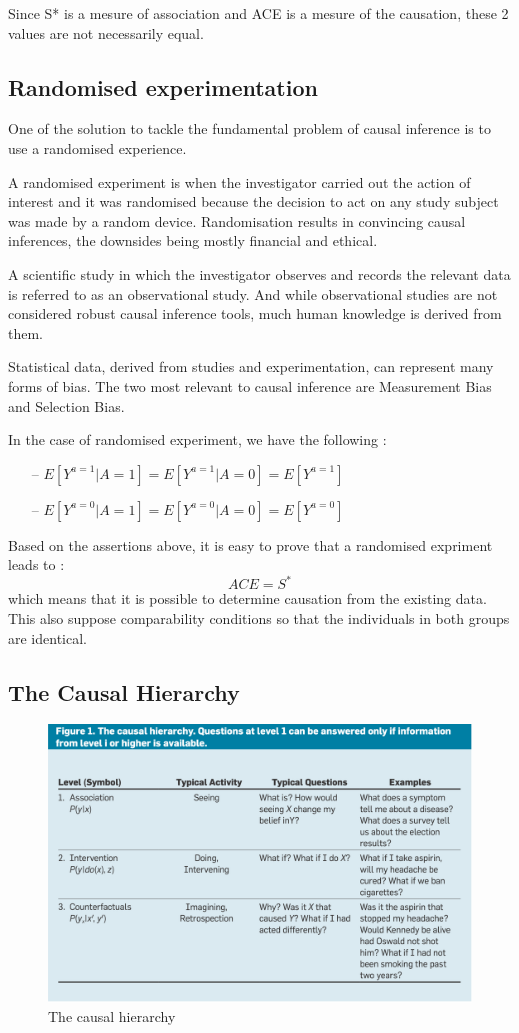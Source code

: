 \documentclass{article}
\begin{document}
Since S* is a mesure of association and ACE is a mesure of the causation, these 2 values are not necessarily equal.


\subsection{Randomised experimentation}

One of the solution to tackle the fundamental problem of causal inference is to use a randomised experience. 

A randomised experiment is when the investigator carried out the action of interest and it was randomised because the decision to act on any study subject was made by a random device. Randomisation results in convincing causal inferences, the downsides being mostly financial and ethical. 

A scientific study in which the investigator observes and records the relevant data is referred to as an observational study. And while observational studies are not considered robust causal inference tools, much human knowledge is derived from them.

Statistical data, derived from studies and experimentation, can represent many forms of bias. The two most relevant to causal inference are Measurement Bias and Selection Bias.


In the case of randomised experiment, we have the following : 

\begin{itemize}
\item[--] $ E[Y^{a=1}|A=1] =  E[Y^{a=1}|A=0] =  E[Y^{a=1}] $
\item[--] $ E[Y^{a=0}|A=1] =  E[Y^{a=0}|A=0] =  E[Y^{a=0}] $
\end{itemize}

Based on the assertions above, it is easy to prove that a randomised expriment leads to  : $$ ACE = S^{*} $$ which means that it is possible to determine causation from the existing data. This also suppose comparability conditions so that the individuals in both groups are identical.


\subsection{The Causal Hierarchy}

\begin{figure}[h]
\centering
\includegraphics[width=0.6 \textwidth]{figures/asso_inter_caus.png}
\caption{The causal hierarchy\cite{pearl2019seven}}
\end{figure}
\end{document}
